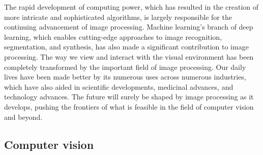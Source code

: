 \documentclass[a4paper,11pt]{report}%
\renewcommand{\\}{\vspace*{0.5\baselineskip} \newline}
\begin{document}
\noindent The rapid development of computing power, which has resulted in the creation of more intricate and sophisticated algorithms, is largely responsible for the continuing advancement of image processing. Machine learning's branch of deep learning, which enables cutting-edge approaches to image recognition, segmentation, and synthesis, has also made a significant contribution to image processing.
The way we view and interact with the visual environment has been completely transformed by the important field of image processing. Our daily lives have been made better by its numerous uses across numerous industries, which have also aided in scientific developments, medicinal advances, and technology advances. The future will surely be shaped by image processing as it develops, pushing the frontiers of what is feasible in the field of computer vision and beyond.

\subsection{Computer vision}
\end{document}
